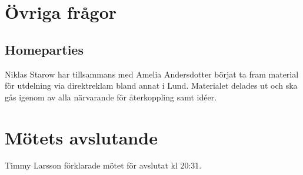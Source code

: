 \documentclass[a4paper,10pt]{article}
\begin{document}
\section{Övriga frågor}
\subsection*{Homeparties}
Niklas Starow har tillsammans med Amelia Andersdotter börjat ta fram material för utdelning via direktreklam bland annat i Lund. Materialet delades ut och ska gås igenom av alla närvarande för återkoppling samt idéer.

\section{Mötets avslutande}
Timmy Larsson förklarade mötet för avslutat kl 20:31.
\end{document}
